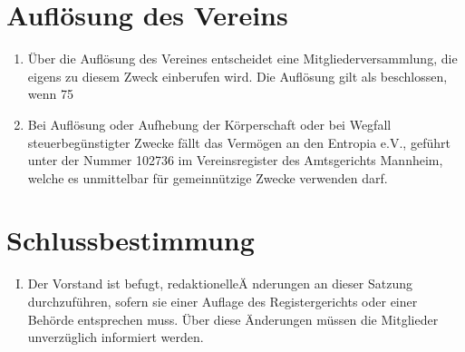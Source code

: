 \documentclass[12pt,a4paper,titlepage]{scrartcl}
\begin{document}
\section{Auflösung des Vereins}
\begin{enumerate}
\item Über die Auflösung des Vereines entscheidet eine Mitgliederversammlung, die eigens zu diesem Zweck einberufen wird. Die Auflösung gilt als beschlossen, wenn 75%
\item  Bei Auflösung oder Aufhebung der Körperschaft oder bei Wegfall steuerbegünstigter Zwecke fällt das Vermögen an den Entropia e.V., geführt unter der Nummer 102736 im Vereinsregister des Amtsgerichts Mannheim, welche es unmittelbar für gemeinnützige Zwecke verwenden darf.
\end{enumerate}


\section{Schlussbestimmung}
\begin{enumerate}[I.]
\item Der Vorstand ist befugt, redaktionelleÄ nderungen an dieser Satzung durchzuführen,
sofern sie einer Auflage des Registergerichts oder einer Behörde entsprechen muss. Über diese Änderungen müssen die Mitglieder unverzüglich informiert werden.
\end{enumerate}
\end{document}
